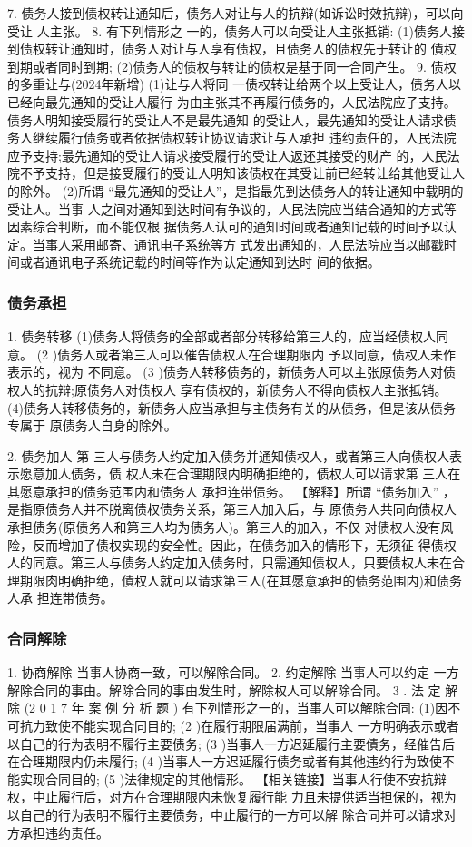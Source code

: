 \documentclass[UTF8,12pt]{ctexart}
\numberwithin{equation}{section} %
\numberwithin{figure}{section}
\numberwithin{table}{section}
\begin{document}
	7. 债务人接到债权转让通知后，债务人对让与人的抗辩(如诉讼时效抗辩)，可以向受让 人主张。
	8. 有下列情形之 一的，债务人可以向受让人主张抵销: (1)债务人接到债权转让通知时，债务人对让与人享有债权，且债务人的债权先于转让的 債权到期或者同时到期;
	(2)债务人的债权与转让的债权是基于同一合同产生。
	9. 债权的多重让与(2024年新增)
	(1)让与人将同 一债权转让给两个以上受让人，债务人以已经向最先通知的受让人履行 为由主张其不再履行债务的，人民法院应子支持。债务人明知接受履行的受让人不是最先通知 的受让人，最先通知的受让人请求债务人继续履行债务或者依据债权转让协议请求让与人承担 违约责任的，人民法院应予支持;最先通知的受让人请求接受履行的受让人返还其接受的财产 的，人民法院不予支持，但是接受履行的受让人明知该债权在其受让前已经转让给其他受让人 的除外。
	(2)所谓 “最先通知的受让人”，是指最先到达债务人的转让通知中载明的受让人。当事 人之间对通知到达时间有争议的，人民法院应当结合通知的方式等因素综合判断，而不能仅根 据债务人认可的通知时间或者通知记载的时间予以认定。当事人采用邮寄、通讯电子系统等方 式发出通知的，人民法院应当以邮戳时间或者通讯电子系统记载的时间等作为认定通知到达时 间的依据。
	
	\subsubsection{债务承担}
	1. 债务转移 (1)债务人将债务的全部或者部分转移给第三人的，应当经债权人同意。
	(2 )债务人或者第三人可以催告债权人在合理期限内 予以同意，债权人未作表示的，视为 不同意。
	(3 )债务人转移债务的，新债务人可以主张原债务人对债权人的抗辩;原债务人对债权人 享有债权的，新债务人不得向债权人主张抵销。
	(4)债务人转移债务的，新债务人应当承担与主债务有关的从债务，但是该从债务专属于 原债务人自身的除外。
	
	2. 债务加人
	第 三人与债务人约定加入债务并通知债权人，或者第三人向债权人表示愿意加人债务，债 权人未在合理期限内明确拒绝的，债权人可以请求第 三人在其愿意承担的债务范围内和债务人 承担连带债务。
	【解释】所谓 “债务加入” ，是指原债务人并不脱离债权债务关系，第三人加入后，与 原债务人共同向债权人承担债务(原债务人和第三人均为债务人)。第三人的加入，不仅 对债权人没有风险，反而增加了债权实现的安全性。因此，在债务加入的情形下，无须征 得债权人的同意。第三人与债务人约定加入债务时，只需通知债权人，只要债权人未在合 理期限肉明确拒绝，債权人就可以请求第三人(在其愿意承担的债务范围内)和债务人承 担连带债务。
	
	\subsubsection{合同解除}
	1. 协商解除
	当事人协商一致，可以解除合同。
	2. 约定解除
	当事人可以约定 一方解除合同的事由。解除合同的事由发生时，解除权人可以解除合同。 3 . 法 定 解 除 (2 0 1 7 年 案 例 分 析 题 )
	有下列情形之一的，当事人可以解除合同:
	(1)因不可抗力致使不能实现合同目的;
	(2 )在履行期限届满前，当事人 一方明确表示或者以自己的行为表明不履行主要债务; (3 )当事人一方迟延履行主要債务，经催告后在合理期限内仍未履行;
	(4 )当事人一方迟延履行债务或者有其他违约行为致使不能实现合同目的;
	(5 )法律规定的其他情形。
	【相关链接】当事人行使不安抗辩权，中止履行后，对方在合理期限内未恢复履行能 力且未提供适当担保的，视为以自己的行为表明不履行主要债务，中止履行的一方可以解 除合同并可以请求对方承担违约责任。
	
\end{document}
